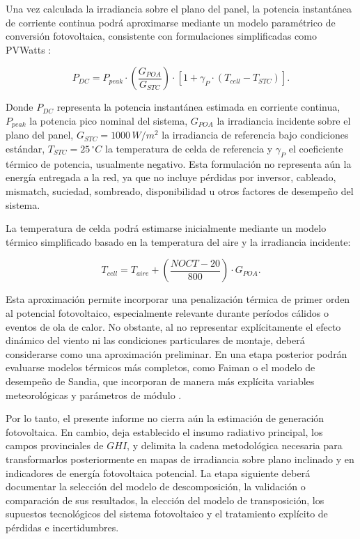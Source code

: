 \documentclass[../main.tex]{subfiles}
\begin{document}
Una vez calculada la irradiancia sobre el plano del panel, la potencia instantánea de corriente continua podrá aproximarse mediante un modelo paramétrico de conversión fotovoltaica, consistente con formulaciones simplificadas como PVWatts \cite{dobos2014}:

\begin{equation}
P_{DC}
=
P_{peak}
\cdot
\left(
\frac{G_{POA}}{G_{STC}}
\right)
\cdot
\left[
1
+
\gamma_{P}
\cdot
\left(
T_{cell}
-
T_{STC}
\right)
\right].
\end{equation}

Donde $P_{DC}$ representa la potencia instantánea estimada en corriente continua, $P_{peak}$ la potencia pico nominal del sistema, $G_{POA}$ la irradiancia incidente sobre el plano del panel, $G_{STC}=1000\,W/m^2$ la irradiancia de referencia bajo condiciones estándar, $T_{STC}=25\,^{\circ}C$ la temperatura de celda de referencia y $\gamma_P$ el coeficiente térmico de potencia, usualmente negativo. Esta formulación no representa aún la energía entregada a la red, ya que no incluye pérdidas por inversor, cableado, mismatch, suciedad, sombreado, disponibilidad u otros factores de desempeño del sistema.

La temperatura de celda podrá estimarse inicialmente mediante un modelo térmico simplificado basado en la temperatura del aire y la irradiancia incidente:

\begin{equation}
T_{cell}
=
T_{aire}
+
\left(
\frac{NOCT - 20}{800}
\right)
\cdot
G_{POA}.
\end{equation}

Esta aproximación permite incorporar una penalización térmica de primer orden al potencial fotovoltaico, especialmente relevante durante períodos cálidos o eventos de ola de calor. No obstante, al no representar explícitamente el efecto dinámico del viento ni las condiciones particulares de montaje, deberá considerarse como una aproximación preliminar. En una etapa posterior podrán evaluarse modelos térmicos más completos, como Faiman o el modelo de desempeño de Sandia, que incorporan de manera más explícita variables meteorológicas y parámetros de módulo \cite{faiman2008,king2004}.

Por lo tanto, el presente informe no cierra aún la estimación de generación fotovoltaica. En cambio, deja establecido el insumo radiativo principal, los campos provinciales de $GHI$, y delimita la cadena metodológica necesaria para transformarlos posteriormente en mapas de irradiancia sobre plano inclinado y en indicadores de energía fotovoltaica potencial. La etapa siguiente deberá documentar la selección del modelo de descomposición, la validación o comparación de sus resultados, la elección del modelo de transposición, los supuestos tecnológicos del sistema fotovoltaico y el tratamiento explícito de pérdidas e incertidumbres.
\end{document}
